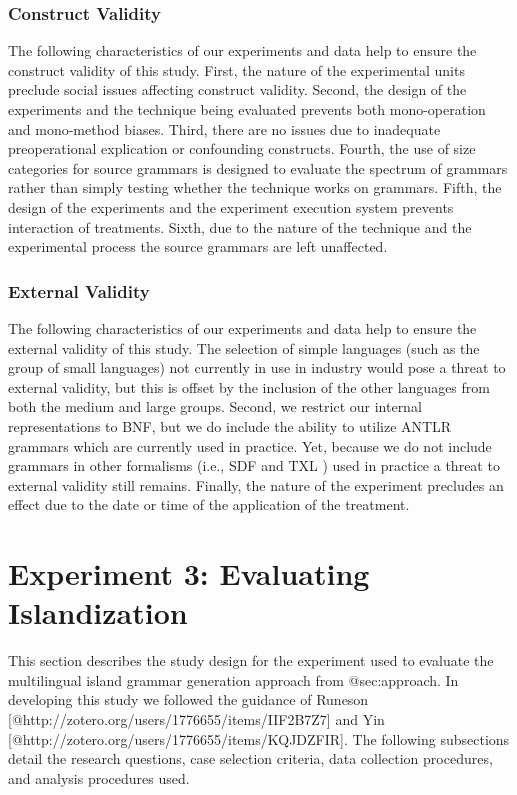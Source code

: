 \documentclass[10pt,nocc]{xrese_report}
\begin{document}
\subsubsection{Construct Validity}

The following characteristics of our experiments and data help to ensure the construct validity of this study. First, the nature of the experimental units preclude social issues affecting construct validity. Second, the design of the experiments and the technique being evaluated prevents both mono-operation and mono-method biases. Third, there are no issues due to inadequate preoperational explication or confounding constructs. Fourth, the use of size categories for source grammars is designed to evaluate the spectrum of grammars rather than simply testing whether the technique works on grammars. Fifth, the design of the experiments and the experiment execution system prevents interaction of treatments. Sixth, due to the nature of the technique and the experimental process the source grammars are left unaffected.

\subsubsection{External Validity}

The following characteristics of our experiments and data help to ensure the external validity of this study. The selection of simple languages (such as the group of small languages) not currently in use in industry would pose a threat to external validity, but this is offset by the inclusion of the other languages from both the medium and large groups. Second, we restrict our internal representations to BNF, but we do include the ability to utilize ANTLR grammars which are currently used in practice. Yet, because we do not include grammars in other formalisms (i.e., SDF \cite{heering_syntax_1989} and TXL \cite{cordy_txl_2004}) used in practice a threat to external validity still remains. Finally, the nature of the experiment precludes an effect due to the date or time of the application of the treatment.

\section{Experiment 3: Evaluating Islandization}

This section describes the study design for the experiment used to evaluate the multilingual island grammar generation approach from @sec:approach. In developing this study we followed the guidance of Runeson [@http://zotero.org/users/1776655/items/IIF2B7Z7] and Yin [@http://zotero.org/users/1776655/items/KQJDZFIR]. The following subsections detail the research questions, case selection criteria, data collection procedures, and analysis procedures used.
\end{document}
